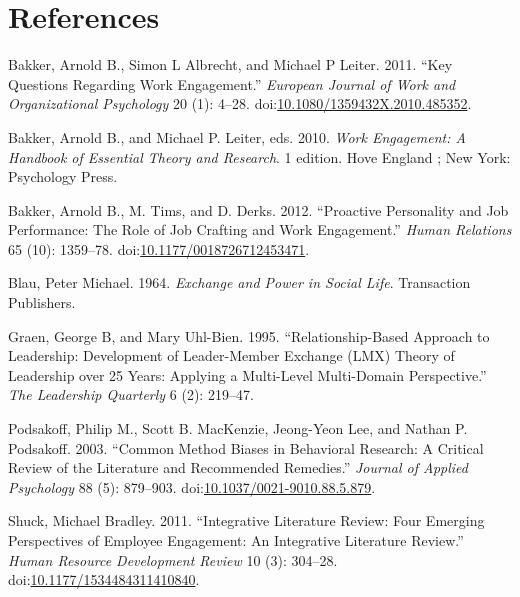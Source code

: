 \documentclass[12pt,a4paper,]{article}
\begin{document}
\section*{References}\label{references}

Bakker, Arnold B., Simon L Albrecht, and Michael P Leiter. 2011. ``Key
Questions Regarding Work Engagement.'' \emph{European Journal of Work
and Organizational Psychology} 20 (1): 4--28.
doi:\href{http://dx.doi.org/10.1080/1359432X.2010.485352}{10.1080/1359432X.2010.485352}.

Bakker, Arnold B., and Michael P. Leiter, eds. 2010. \emph{Work
Engagement: A Handbook of Essential Theory and Research}. 1 edition.
Hove England ; New York: Psychology Press.

Bakker, Arnold B., M. Tims, and D. Derks. 2012. ``Proactive Personality
and Job Performance: The Role of Job Crafting and Work Engagement.''
\emph{Human Relations} 65 (10): 1359--78.
doi:\href{http://dx.doi.org/10.1177/0018726712453471}{10.1177/0018726712453471}.

Blau, Peter Michael. 1964. \emph{Exchange and Power in Social Life}.
Transaction Publishers.

Graen, George B, and Mary Uhl-Bien. 1995. ``Relationship-Based Approach
to Leadership: Development of Leader-Member Exchange (LMX) Theory of
Leadership over 25 Years: Applying a Multi-Level Multi-Domain
Perspective.'' \emph{The Leadership Quarterly} 6 (2): 219--47.

Podsakoff, Philip M., Scott B. MacKenzie, Jeong-Yeon Lee, and Nathan P.
Podsakoff. 2003. ``Common Method Biases in Behavioral Research: A
Critical Review of the Literature and Recommended Remedies.''
\emph{Journal of Applied Psychology} 88 (5): 879--903.
doi:\href{http://dx.doi.org/10.1037/0021-9010.88.5.879}{10.1037/0021-9010.88.5.879}.

Shuck, Michael Bradley. 2011. ``Integrative Literature Review: Four
Emerging Perspectives of Employee Engagement: An Integrative Literature
Review.'' \emph{Human Resource Development Review} 10 (3): 304--28.
doi:\href{http://dx.doi.org/10.1177/1534484311410840}{10.1177/1534484311410840}.
\end{document}
